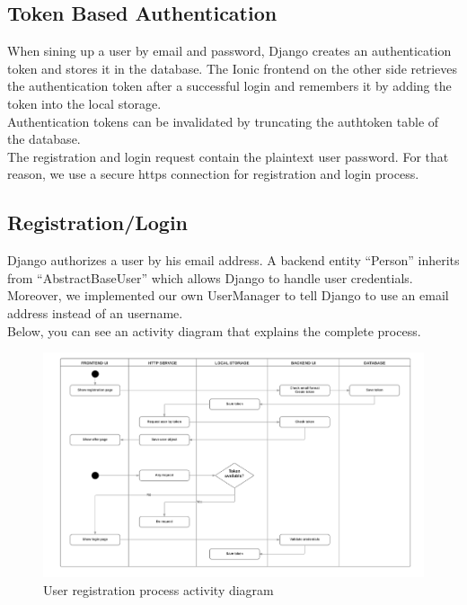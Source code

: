 \documentclass[11pt]{article} %
\begin{document}
\subsection{Token Based Authentication}
When sining up a user by email and password, Django creates an authentication token and stores it in the database. The Ionic frontend on the other side retrieves the authentication token after a successful login and remembers it by adding the token into the local storage.\\
Authentication tokens can be invalidated by truncating the authtoken table of the database.\\
The registration and login request contain the plaintext user password. For that reason, we use a secure https connection for registration and login process.

\subsection{Registration/Login}
Django authorizes a user by his email address. A backend entity “Person” inherits from “AbstractBaseUser” which allows Django to handle user credentials. Moreover, we implemented our own UserManager to tell Django to use an email address instead of an username.\\
Below, you can see an activity diagram that explains the complete process.

\begin{figure}[H]
\begin{center}
\includegraphics[]{registration_process}
\end{center}
\caption{User registration process activity diagram}
\label{fig:registration_process}
\end{figure}
\end{document}
